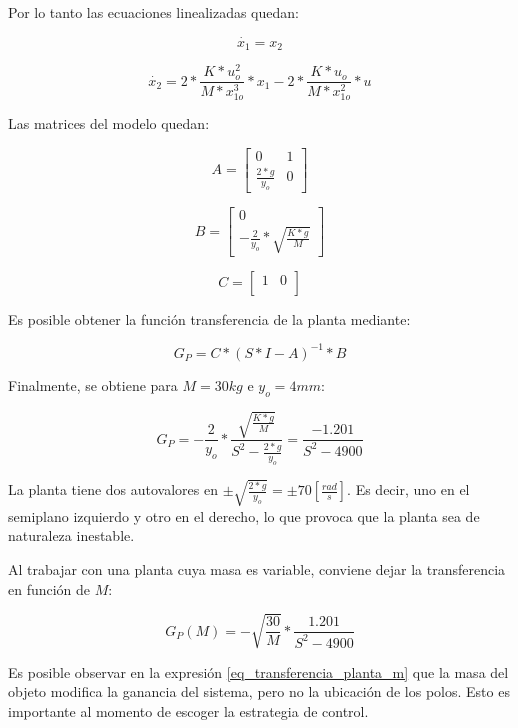 \noindent Por lo tanto las ecuaciones linealizadas quedan:

\begin{equation}
	\dot{x_{1}}=x_{2}
\end{equation}

\begin{equation}
	\dot{x_{2}}=2*\frac{K*u_{o}^{2}}{M*x_{1o}^{3}}*x_{1}-2*\frac{K*u_{o}}{M*x_{1o}^{2}}*u
\end{equation}

\noindent Las matrices del modelo quedan:

\begin{equation}
	A=\begin{bmatrix}
		0 & 1\\
		\frac{2*g}{y_{o}} & 0
	\end{bmatrix}
\end{equation}

\begin{equation}
	B=\begin{bmatrix}
		0\\
		-\frac{2}{y_{o}}*\sqrt{\frac{K*g}{M}}
	\end{bmatrix}
\end{equation}

\begin{equation}
	C=\begin{bmatrix}
		1 & 0\\
	\end{bmatrix}
\end{equation}

\noindent Es posible obtener la función transferencia de la planta mediante:

\begin{equation}\label{eq_transferencia_planta}
	G_{P}=C*(S*I-A)^{-1}*B
\end{equation}

\noindent Finalmente, se obtiene para $M=30kg$ e $y_{o}=4mm$:

\begin{equation}
	G_{P}=-\frac{2}{y_{o}}*\frac{\sqrt{\frac{K*g}{M}}}{S^2-\frac{2*g}{y_{o}}}=\frac{-1.201}{S^{2}-4900}
\end{equation}

\noindent La planta tiene dos autovalores en $\pm\sqrt{\frac{2*g}{y_{o}}}=\pm70[\frac{rad}{s}]$. Es decir, uno en el semiplano izquierdo y otro en el derecho, lo que provoca que la planta sea de naturaleza inestable.

\noindent Al trabajar con una planta cuya masa es variable, conviene dejar la transferencia en función de $M$:

\begin{equation} \label{eq_transferencia_planta_m}
		G_{P}(M)=-\sqrt{\frac{30}{M}}*\frac{1.201}{S^{2}-4900}
\end{equation}

\noindent Es posible observar en la expresión \ref{eq_transferencia_planta_m} que la masa del objeto modifica la ganancia del sistema, pero no la ubicación de los polos. Esto es importante al momento de escoger la estrategia de control.

